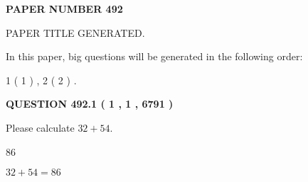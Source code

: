 \documentclass[12pt]{article}
\begin{document}
   
   
   
\newpage 
\setcounter{page}{ 
   492001 } 
   
   
   
   
 {\textbf{ \Large{ PAPER NUMBER  492  }}}
   
   
\vspace{0.2in}
   
   
   
   
   
   
   
   
 \vspace{0.2in}
 
 
 
 
   
   
 PAPER TITLE GENERATED.
   
   
   
\vspace{0.2in}
   
In this paper, big questions will be generated in the following order: 
   
   
   1 ( 1 )
 ,
   2 ( 2 )
 .
  
\vspace{0.2in}
  
{\textbf{\Large{QUESTION
492.1 
 ( 1 , 1 , 6791 )
}}}
  
  
 
Please calculate $ %
32 +  %
54 $.
 
 
 
\noindent{}
 
 

86
 
 
\noindent{}
 
 

 
 
 
\noindent{}
 
 

$ %
32 +  %
54=   %
86$
 
 
\noindent{}
 
 

 
   
   
   
\end{document}
